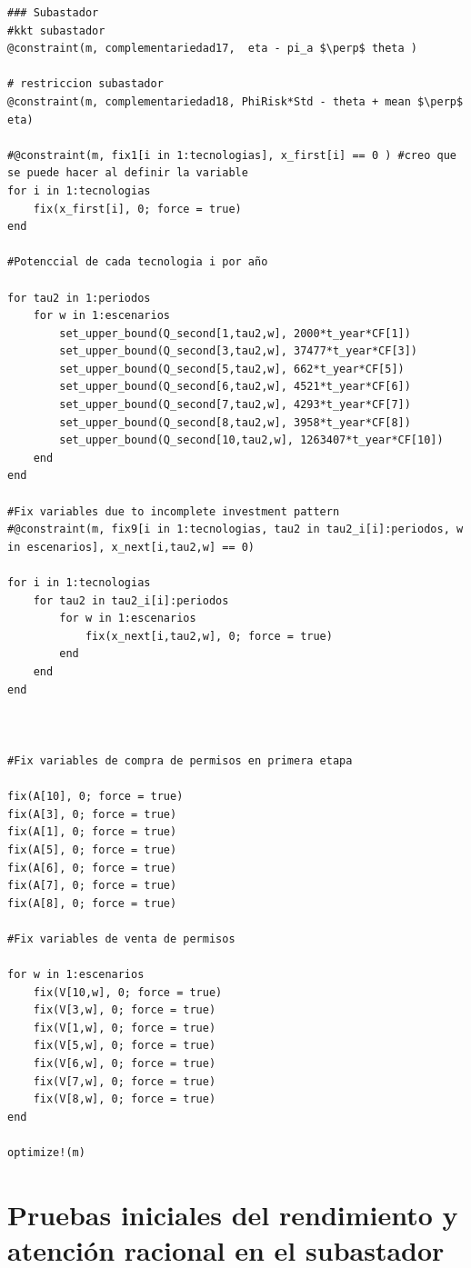\begin{footnotesize}
\begin{lstlisting}
### Subastador
#kkt subastador
@constraint(m, complementariedad17,  eta - pi_a $\perp$ theta )

# restriccion subastador
@constraint(m, complementariedad18, PhiRisk*Std - theta + mean $\perp$ eta)

#@constraint(m, fix1[i in 1:tecnologias], x_first[i] == 0 ) #creo que se puede hacer al definir la variable
for i in 1:tecnologias
    fix(x_first[i], 0; force = true)
end

#Potenccial de cada tecnologia i por año 

for tau2 in 1:periodos
    for w in 1:escenarios
        set_upper_bound(Q_second[1,tau2,w], 2000*t_year*CF[1])
        set_upper_bound(Q_second[3,tau2,w], 37477*t_year*CF[3])
        set_upper_bound(Q_second[5,tau2,w], 662*t_year*CF[5])
        set_upper_bound(Q_second[6,tau2,w], 4521*t_year*CF[6])
        set_upper_bound(Q_second[7,tau2,w], 4293*t_year*CF[7])
        set_upper_bound(Q_second[8,tau2,w], 3958*t_year*CF[8])
        set_upper_bound(Q_second[10,tau2,w], 1263407*t_year*CF[10])
    end
end

#Fix variables due to incomplete investment pattern
#@constraint(m, fix9[i in 1:tecnologias, tau2 in tau2_i[i]:periodos, w in escenarios], x_next[i,tau2,w] == 0)

for i in 1:tecnologias
    for tau2 in tau2_i[i]:periodos
        for w in 1:escenarios
            fix(x_next[i,tau2,w], 0; force = true)
        end
    end
end



#Fix variables de compra de permisos en primera etapa 

fix(A[10], 0; force = true)
fix(A[3], 0; force = true)
fix(A[1], 0; force = true)
fix(A[5], 0; force = true)
fix(A[6], 0; force = true)
fix(A[7], 0; force = true)
fix(A[8], 0; force = true)

#Fix variables de venta de permisos

for w in 1:escenarios
    fix(V[10,w], 0; force = true)
    fix(V[3,w], 0; force = true)
    fix(V[1,w], 0; force = true)
    fix(V[5,w], 0; force = true)
    fix(V[6,w], 0; force = true)
    fix(V[7,w], 0; force = true)
    fix(V[8,w], 0; force = true)
end

optimize!(m)
\end{lstlisting}
\end{footnotesize}

\section{Pruebas iniciales del rendimiento y atención racional en el subastador}\label{anexo:rendimiento}


